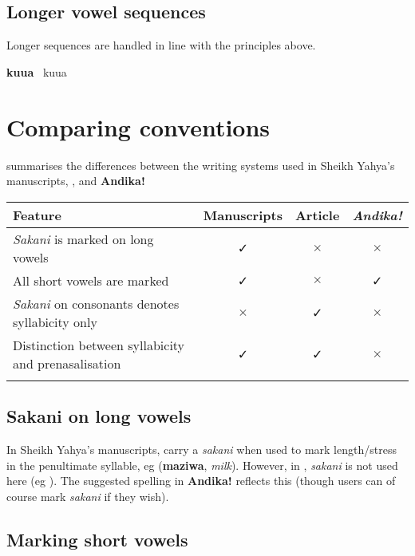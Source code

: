 \subsection{Longer vowel sequences}

Longer sequences are handled in line with the principles above.

\hangindent=3cm
\textbf{kuua} \textrightarrow\ kuua \textrightarrow\ 



\section{Comparing conventions}

 summarises the differences between the writing systems used in Sheikh Yahya's manuscripts, \citet{Omar1997}, and \textbf{Andika!}

\begin{longtable}[c]{lccc}
\textbf{Feature} & \textbf{Manuscripts} & \textbf{Article} & \textbf{\textit{Andika!}} \\
\hline\noalign{\medskip}
\textit{Sakani} is marked on long vowels & ✓ & $\times$ & $\times$ \\
All short vowels are marked & ✓ & $\times$ & ✓ \\
\textit{Sakani} on consonants denotes syllabicity only & $\times$ & ✓ & $\times$ \\
Distinction between syllabicity and prenasalisation & ✓ & ✓ & $\times$ \\
\label{tab:comp}
\end{longtable}

\subsection{Sakani on long vowels}

In Sheikh Yahya's manuscripts,  carry a \textit{sakani} when used to mark length/stress in the penultimate syllable, eg  (\textbf{maziwa}, \textit{milk}). However, in \citet{Omar1997}, \textit{sakani} is not used here (eg ). The suggested spelling in \textbf{Andika!} reflects this (though users can of course mark \textit{sakani} if they wish).

\subsection{Marking short vowels}

